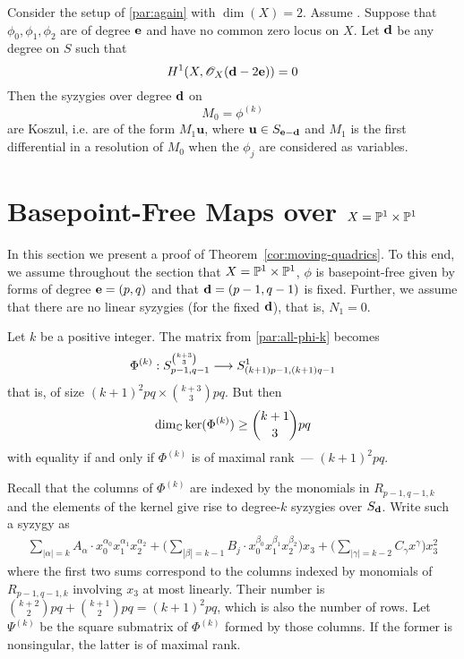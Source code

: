 \documentclass[fleqn,reqno]{amsart}
\begin{document}
\begin{proposition}
\label{prop:koszul-syzygies}
Consider the setup of \eqref{par:again} with $\dim(X)=2$.
Assume .
Suppose that $\phi_0,\phi_1,\phi_2$ are of degree $\mathbf e$ and have no common zero locus on $X$.
Let $\mathbf d$ be any degree on $S$ such that
\[
	H^1(X,\mathscr{O}_X(\mathbf d-2\mathbf e))=0
\]
Then the syzygies over degree $\mathbf d$ on
\[
	M_0=\phi^{(k)}
\]
are Koszul, i.e. are of the form $M_1{\mathbf u}$,
where $\mathbf u\in S_{\mathbf e-\mathbf d}$
and $M_1$ is the first differential in a resolution of $M_0$
when the $\phi_j$ are considered as variables.
\end{proposition}



\section{Basepoint-Free Maps over $X=\mathbb{P}^1\times\mathbb{P}^1$}
\label{sec:moving-quadrics}

\begin{paragraf*}
In this section we present a proof of Theorem~\ref{cor:moving-quadrics}.
To this end, we assume throughout the section that $X=\mathbb{P}^1\times\mathbb{P}^1$,
$\phi$ is basepoint-free given by forms of degree $\mathbf e=(p,q)$
and that $\mathbf d=(p-1,q-1)$ is fixed.
Further, we assume that there are no linear syzygies (for the fixed $\mathbf d$),
that is, $N_1=0$.
\end{paragraf*}

\begin{paragraph}
\label{par:count-rels}
Let $k$ be a positive integer.
The matrix from \eqref{par:all-phi-k} becomes
\[
	\Phi^{(k)}:S_{p-1,q-1}^{\binom{k+3}{3}}\longrightarrow S_{(k+1)p-1,(k+1)q-1}^1
\]
that is, of size $(k+1)^2pq\times\binom{k+3}{3}pq$.
But then
\begin{align}
	\dim_{\mathbb{C}}\ker(\Phi^{(k)})\geq\binom{k+1}{3}pq\label{eqn1}
\end{align}
with equality if and only if $\Phi^{(k)}$ is of maximal rank~--- $(k+1)^2pq$.
\end{paragraph}

\begin{paragraph}
Recall that the columns of $\Phi^{(k)}$ are indexed
by the monomials in $R_{p-1,q-1,k}$
and the elements of the kernel give rise to degree-$k$ syzygies over $S_\mathbf d$.
Write such a syzygy as
\begin{align}\label{ebasi}
	\sum_{|\alpha|=k} A_\alpha\cdot
	x_0^{\alpha_0}x_1^{\alpha_1}x_2^{\alpha_2}+
	\big(\sum_{|\beta|=k-1} B_{j}\cdot
	x_0^{\beta_0}x_1^{\beta_1}x_2^{\beta_2}\big)x_3+
	\big(\sum_{|\gamma|=k-2}C_\gamma x^\gamma\big)x_3^2
\end{align}
where the first two sums correspond to
the columns indexed by monomials of $R_{p-1,q-1,k}$ involving $x_3$ at most linearly.
Their number is $\binom{k+2}{2}pq+\binom{k+1}{2}pq=(k+1)^2pq$,
which is also the number of rows.
Let $\Psi^{(k)}$ be the square submatrix of $\Phi^{(k)}$ formed by those columns.
If the former is nonsingular, the latter is of maximal rank.
\end{paragraph}
\end{document}

